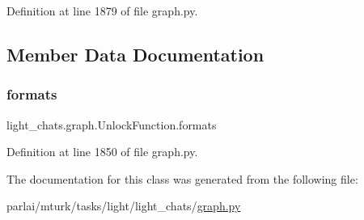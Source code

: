 Definition at line 1879 of file graph.\+py.



\subsection{Member Data Documentation}
\mbox{\label{classlight__chats_1_1graph_1_1UnlockFunction_a8e80f007572fa2ce7624eca4ec645a56}} 
\subsubsection{\texorpdfstring{formats}{formats}}
{\footnotesize\ttfamily light\+\_\+chats.\+graph.\+Unlock\+Function.\+formats}



Definition at line 1850 of file graph.\+py.



The documentation for this class was generated from the following file\+:\begin{DoxyCompactItemize}
\item 
parlai/mturk/tasks/light/light\+\_\+chats/\hyperlink{parlai_2mturk_2tasks_2light_2light__chats_2graph_8py}{graph.\+py}\end{DoxyCompactItemize}
